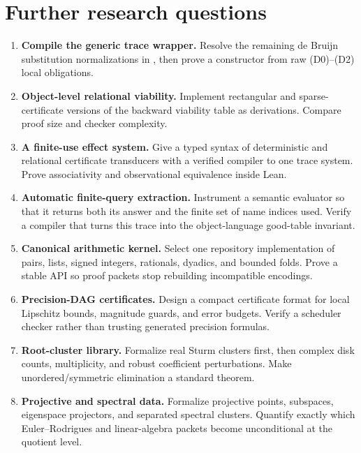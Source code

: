 \section{Further research questions}
\label{sec:research}

\begin{enumerate}[label=\arabic*.]
\item \textbf{Compile the generic trace wrapper.}  Resolve the remaining de Bruijn substitution normalizations in , then prove a constructor from raw (D0)--(D2) local obligations.

\item \textbf{Object-level relational viability.}  Implement rectangular and sparse-certificate versions of the backward viability table as  derivations.  Compare proof size and checker complexity.

\item \textbf{A finite-use effect system.}  Give a typed syntax of deterministic and relational certificate transducers with a verified compiler to one trace system.  Prove associativity and observational equivalence inside Lean.

\item \textbf{Automatic finite-query extraction.}  Instrument a semantic evaluator so that it returns both its answer and the finite set of name indices used.  Verify a compiler that turns this trace into the object-language good-table invariant.

\item \textbf{Canonical arithmetic kernel.}  Select one repository implementation of pairs, lists, signed integers, rationals, dyadics, and bounded folds.  Prove a stable API so proof packets stop rebuilding incompatible encodings.

\item \textbf{Precision-DAG certificates.}  Design a compact certificate format for local Lipschitz bounds, magnitude guards, and error budgets.  Verify a scheduler checker rather than trusting generated precision formulas.

\item \textbf{Root-cluster library.}  Formalize real Sturm clusters first, then complex disk counts, multiplicity, and robust coefficient perturbations.  Make unordered/symmetric elimination a standard theorem.

\item \textbf{Projective and spectral data.}  Formalize projective points, subspaces, eigenspace projectors, and separated spectral clusters.  Quantify exactly which Euler--Rodrigues and linear-algebra packets become unconditional at the quotient level.


\end{enumerate}
